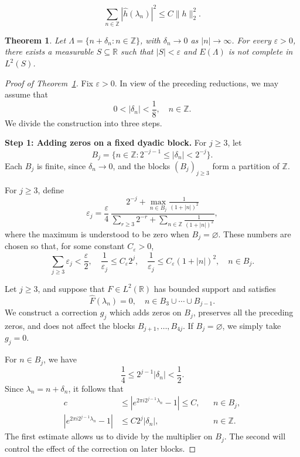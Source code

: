 \documentclass[10pt,a4paper]{amsart}
\newtheorem{theorem}{Theorem}
\def\R{{\mathbb R}}
\def\Z{{\mathbb Z}}
\begin{document}
\begin{equation}\label{eq:asymp-bessel}
    \sum_{n\in\Z}|\widehat h(\lambda_n)|^2
    \leq C\|h\|_2^2.
\end{equation}

\begin{theorem}\label{thm:null}
    Let $\Lambda = \{ n+ \delta_n : n \in \Z \}$, with $\delta_n\to 0$ as $|n|\to\infty$. For every $\varepsilon>0$, there exists a measurable $S \subseteq \R$ such that $|S| < \varepsilon$ and $E(\Lambda)$ is not complete in $L^2(S)$.
\end{theorem}

\begin{proof}[Proof of Theorem~\ref{thm:null}]
Fix \(\varepsilon>0\). In view of the preceding reductions, we may
assume that
\[
    0<|\delta_n|<\frac18,\quad n\in\Z.
\]
We divide the construction into three steps.

\medskip
\noindent\textbf{Step 1: Adding zeros on a fixed dyadic block.}
For \(j\geq3\), let
\[
    B_j=\{n\in\Z:2^{-j-1}\leq|\delta_n|<2^{-j}\}.
\]
Each \(B_j\) is finite, since \(\delta_n\to0\), and the blocks
\((B_j)_{j\geq3}\) form a partition of \(\Z\).

For \(j\geq3\), define
\[
    \varepsilon_j
    =\frac{\varepsilon}{4}\,
    \frac{
        2^{-j}+\displaystyle\max_{n\in B_j}\frac1{(1+|n|)^2}
    }{
        \displaystyle\sum_{r\geq3}2^{-r}
        +\displaystyle\sum_{n\in\Z}\frac1{(1+|n|)^2}
    },
\]
where the maximum is understood to be zero when \(B_j=\varnothing\). These numbers are chosen so that, for some constant
\(C_\varepsilon>0\),
\begin{equation}\label{eq:asymp-support-budget}
    \sum_{j\geq3}\varepsilon_j<\frac{\varepsilon}{2},
    \quad
    \frac1{\varepsilon_j}\leq C_\varepsilon 2^j,
    \quad
    \frac1{\varepsilon_j}
    \leq C_\varepsilon(1+|n|)^2,
    \quad n\in B_j.
\end{equation}

Let \(j\geq3\), and suppose that \(F\in L^2(\R)\) has bounded support and satisfies
\[
    \widehat F(\lambda_n)=0,
    \quad n\in B_3\cup\cdots\cup B_{j-1}.
\]
We construct a correction \(g_j\) which adds zeros on \(B_j\), preserves all the preceding zeros, and does not affect the blocks \(B_{j+1},\ldots,B_{4j}\). If \(B_j=\varnothing\), we simply take \(g_j=0\).

For \(n\in B_j\), we have
\[
    \frac14\leq2^{j-1}|\delta_n|<\frac12.
\]
Since \(\lambda_n=n+\delta_n\), it follows that
\begin{equation}\label{eq:asymp-dyadic-multiplier}
\begin{aligned}
    c
    &\leq
    \left|e^{2\pi i2^{j-1}\lambda_n}-1\right|
    \leq C,
    && n\in B_j,\\
    \left|e^{2\pi i2^{j-1}\lambda_n}-1\right|
    &\leq C2^j|\delta_n|,
    && n\in\Z.
\end{aligned}
\end{equation}
The first estimate allows us to divide by the multiplier on \(B_j\).
The second will control the effect of the correction on later blocks.


\end{proof}
\end{document}
